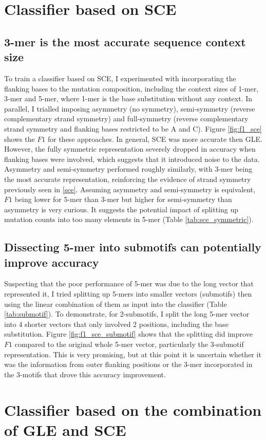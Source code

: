 

\newpage
\section{Classifier based on SCE}\label{ml:sce}

\subsection{3-mer is the most accurate sequence context size}
To train a classifier based on SCE, I experimented with incorporating the flanking bases to the mutation composition, including the context sizes of 1-mer, 3-mer and 5-mer, where 1-mer is the base substitution without any context. In parallel, I trialled imposing asymmetry (no symmetry), semi-symmetry (reverse complementary strand symmetry) and full-symmetry (reverse complementary strand symmetry and flanking bases restricted to be A and C). Figure \ref{fig:f1_sce} shows the $F1$ for these approaches. In general, SCE was more accurate then GLE. However, the fully symmetric representation severely dropped in accuracy when flanking bases were involved, which suggests that it introduced noise to the data. Asymmetry and semi-symmetry performed roughly similarly, with 3-mer being the most accurate representation, reinforcing the evidence of strand symmetry previously seen in \ref{sce}. Assuming asymmetry and semi-symmetry is equivalent, $F1$ being lower for 5-mer than 3-mer but higher for semi-symmetry than asymmetry is very curious. It suggests the potential impact of splitting up mutation counts into too many elements in 5-mer (Table \ref{tab:sce_symmetric}).



\subsection{Dissecting 5-mer into submotifs can potentially improve accuracy}
Suspecting that the poor performance of 5-mer was due to the long vector that represented it, I tried splitting up 5-mers into smaller vectors (submotifs) then using the linear combination of them as input into the classifier (Table \ref{tab:submotif}). To demonstrate, for 2-submotifs, I split the long 5-mer vector into 4 shorter vectors that only involved 2 positions, including the base substitution. Figure \ref{fig:f1_sce_submotif} shows that the splitting did improve $F1$ compared to the original whole 5-mer vector, particularly the 3-submotif representation. This is very promising, but at this point it is uncertain whether it was the information from outer flanking positions or the 3-mer incorporated in the 3-motifs that drove this accuracy improvement.



\section{Classifier based on the combination of GLE and SCE}\label{ml:both}

